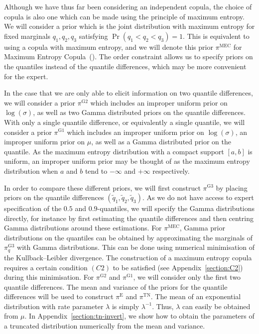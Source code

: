 \documentclass{article}
\begin{document}
%
Although we have thus far been considering an independent copula,
the choice of copula is also one which can be made using
the principle of maximum entropy.
We will consider a prior which is the joint distribution with
maximum entropy for fixed marginals $q_1, q_2, q_3$
satisfying $\Pr(q_1 < q_2 < q_3) = 1$.
This is equivalent to using a copula with maximum entropy,
and we will denote this prior $\pi^{\text{MEC}}$ for Maximum Entropy
Copula~(\cite{butucea2018}).
The order constraint allows us to specify priors on the quantiles instead
of the quantile differences, which may be more convenient for the expert.
%

%
In the case that we are only able to elicit information
on two quantile differences,
we will consider a prior $\pi^{\text{G2}}$
which includes an improper uniform prior on $\log(\sigma)$,
as well as two Gamma distributed priors on the quantile differences.
With only a single quantile difference,
or equivalently a single quantile,
we will consider a prior $\pi^{\text{G1}}$
which includes an improper uniform prior on $\log(\sigma)$,
an improper uniform prior on $\mu$,
as well as a Gamma distributed prior on the quantile.
As the maximum entropy distribution with a compact support $[a, b]$ is uniform,
an improper uniform prior may be thought of as the maximum entropy distribution
when $a$ and $b$ tend to $-\infty$ and $+\infty$ respectively.
%

%
%

%
In order to compare these different priors,
we will first construct $\pi^{\text{G3}}$
by placing priors on the quantile differences
$(\tilde{q}_1, \tilde{q}_2, \tilde{q}_3)$.
As we do not have access to expert specification
of the $0.5$ and $0.9$-quantiles,
we will specify the Gamma distributions directly,
for instance by first estimating the quantile differences
and then centring Gamma distributions around these estimations.
For $\pi^{\text{MEC}}$, Gamma prior distributions on the quantiles
can be obtained by approximating the marginals of $\pi_q^{\text{G3}}$
with Gamma distributions.
This can be done using numerical minimisation
of the Kullback–Leibler divergence.
The construction of a maximum entropy copula requires a certain condition
$(C2)$ to be satisfied (see Appendix~\ref{section:C2})
during this minimisation.
For $\pi^{\text{G2}}$
and $\pi^{\text{G1}}$,
we will consider only the first two quantile differences.
The mean and variance of the priors for the quantile differences
will be used to construct $\pi^{\text{E}}$ and $\pi^{\text{TN}}$.
The mean of an exponential distribution with rate parameter $\lambda$
is simply $\lambda^{-1}$. Thus, $\lambda$ can easily be obtained from $\mu$.
In Appendix~\ref{section:tn-invert},
we show how to obtain the parameters of a truncated distribution
numerically from the mean and variance.
%
\end{document}
